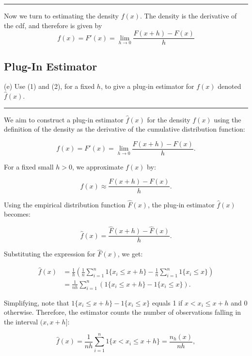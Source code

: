 \documentclass{article}
\newenvironment{colorparagraph}[1]{\par\color{#1}}{\par}
\begin{document}
\begin{colorparagraph}{questioncolor}

\rule{\textwidth}{0.5pt}
Now we turn to estimating the density \( f(x) \). The density is the derivative of the cdf, and therefore is given by
\[
f(x) = F'(x) = \lim_{h \to 0} \frac{F(x + h) - F(x)}{h}
\]
\end{colorparagraph}

\begin{colorparagraph}{questioncolor}
\label{q2e}
\subsection{Plug-In Estimator}
(e) Use (1) and (2), for a fixed \( h \), to give a plug-in estimator for \( f(x) \) denoted \( \hat{f}(x) \).

\rule{\textwidth}{0.5pt}
\end{colorparagraph}

We aim to construct a plug-in estimator \( \hat{f}(x) \) for the density \( f(x) \) using the definition of the density as the derivative of the cumulative distribution function:

\[
f(x) = F'(x) = \lim_{h \to 0} \frac{F(x + h) - F(x)}{h}.
\]

For a fixed small \( h > 0 \), we approximate \( f(x) \) by:

\[
f(x) \approx \frac{F(x + h) - F(x)}{h}.
\]

Using the empirical distribution function \( \hat{F}(x) \), the plug-in estimator \( \hat{f}(x) \) becomes:

\[
\hat{f}(x) = \frac{\hat{F}(x + h) - \hat{F}(x)}{h}.
\]

Substituting the expression for \( \hat{F}(x) \), we get:

\[
\begin{aligned}
\hat{f}(x) &= \frac{1}{h} \left( \frac{1}{n} \sum_{i=1}^n 1\{ x_i \leq x + h \} - \frac{1}{n} \sum_{i=1}^n 1\{ x_i \leq x \} \right) \\
&= \frac{1}{n h} \sum_{i=1}^n \left( 1\{ x_i \leq x + h \} - 1\{ x_i \leq x \} \right).
\end{aligned}
\]

Simplifying, note that \( 1\{ x_i \leq x + h \} - 1\{ x_i \leq x \} \) equals 1 if \( x < x_i \leq x + h \) and 0 otherwise. Therefore, the estimator counts the number of observations falling in the interval \( (x, x + h] \):

\[
\hat{f}(x) = \frac{1}{n h} \sum_{i=1}^n 1\{ x < x_i \leq x + h \} = \frac{n_h(x)}{n h},
\]
\end{document}
